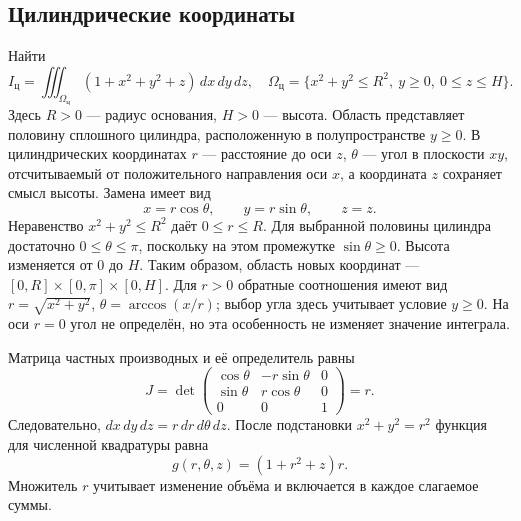 \documentclass[12pt,a4paper]{article}
\begin{document}
\subsection{Цилиндрические координаты}
Найти
\[
I_{\mathrm{ц}}=\iiint_{\Omega_{\mathrm{ц}}}(1+x^2+y^2+z)\,dx\,dy\,dz,
\quad \Omega_{\mathrm{ц}}=\{x^2+y^2\leq R^2,\ y\geq0,\ 0\leq z\leq H\}.
\]
Здесь $R>0$ --- радиус основания, $H>0$ --- высота. Область представляет
половину сплошного цилиндра, расположенную в полупространстве $y\geq0$.
В цилиндрических координатах $r$ --- расстояние до оси $z$, $\theta$ ---
угол в плоскости $xy$, отсчитываемый от положительного направления оси $x$,
а координата $z$ сохраняет смысл высоты. Замена имеет вид
\[
x=r\cos\theta,\qquad y=r\sin\theta,\qquad z=z.
\]
Неравенство $x^2+y^2\leq R^2$ даёт $0\leq r\leq R$.
Для выбранной половины цилиндра достаточно $0\leq\theta\leq\pi$,
поскольку на этом промежутке $\sin\theta\geq0$. Высота изменяется от $0$ до $H$.
Таким образом, область новых координат --- $[0,R]\times[0,\pi]\times[0,H]$.
Для $r>0$ обратные соотношения имеют вид $r=\sqrt{x^2+y^2}$,
$\theta=\arccos(x/r)$; выбор угла здесь учитывает условие $y\geq0$.
На оси $r=0$ угол не определён, но эта особенность не изменяет значение интеграла.

Матрица частных производных и её определитель равны
\[
J=\det\begin{pmatrix}
\cos\theta&-r\sin\theta&0\\
\sin\theta&r\cos\theta&0\\
0&0&1
\end{pmatrix}=r.
\]
Следовательно, $dx\,dy\,dz=r\,dr\,d\theta\,dz$.
После подстановки $x^2+y^2=r^2$ функция для численной квадратуры равна
\[
g(r,\theta,z)=(1+r^2+z)r.
\]
Множитель $r$ учитывает изменение объёма и включается в каждое слагаемое суммы.
\end{document}
